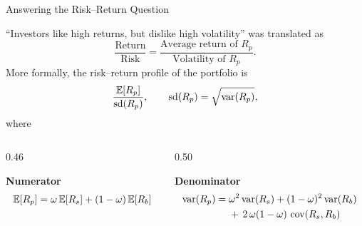 \documentclass[9pt,english,aspectratio=169]{beamer}
\begin{document}
\begin{frame}{Answering the Risk--Return Question}
  
  ``Investors like high returns, but dislike high volatility'' was translated as
  \[\frac{\text{Return}}{\text{Risk}} = \frac{\text{Average return of } R_p}{\text{Volatility of } R_p}.\]
  \pause
  \vspace{0.6em}
  More formally, the risk--return profile of the portfolio is
  \[\frac{\mathbb{E}[R_p]}{\text{sd}(R_p)}, \qquad \text{sd}(R_p) = \sqrt{\operatorname{var}(R_p)},\]
  where
  \pause

  \vspace{-0.4em}
  \begin{columns}[T]
    \begin{column}{0.46\textwidth}
      \begin{methodbox}
        \textbf{Numerator} 
        \[
          \mathbb{E}[R_p] = \omega\, \mathbb{E}[R_s] + (1 - \omega)\, \mathbb{E}[R_b]
        \]
      \end{methodbox}
    \end{column}
    \begin{column}{0.50\textwidth}
      \begin{methodbox}
        \textbf{Denominator} 
        {\small
        \begin{align*}
          \operatorname{var}(R_p) = \;& \omega^2 \operatorname{var}(R_s) + (1 - \omega)^2 \operatorname{var}(R_b) \\
                        & + \, 2\,\omega(1 - \omega)\, \operatorname{cov}(R_s, R_b)
        \end{align*}}
      \end{methodbox}
    \end{column}
  \end{columns}

\end{frame}
\end{document}
